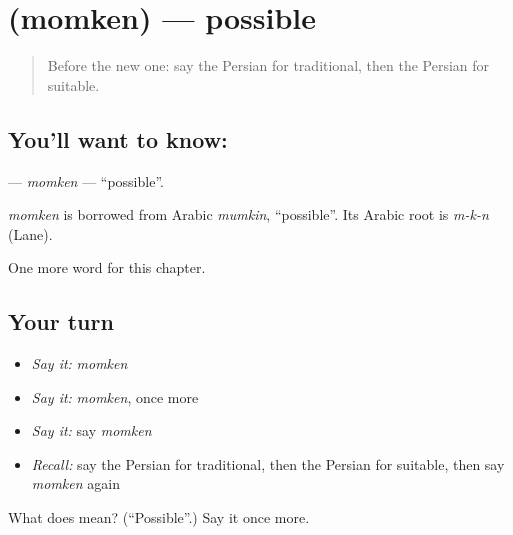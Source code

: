 \section[\texorpdfstring{\fa{ممکن} (momken)}{ممکن (momken)}]{ (momken) — possible}

\label{lesson:FA-C273-momken}



\begin{quote}
Before the new one: say the Persian for traditional, then the Persian for suitable.
\end{quote}

\subsection*{You'll want to know: }
\textbf{} — \emph{momken} — \textquotedblleft{}possible\textquotedblright{}.

\begin{cousinweb}
\emph{momken} is borrowed from Arabic \emph{mumkin}, \textquotedblleft{}possible\textquotedblright{}. Its Arabic root is \emph{m-k-n} (Lane).
\end{cousinweb}

\begin{grammarlens}[title={What you've built}]
One more word for this chapter.
\end{grammarlens}

\subsection*{Your turn}
\begin{itemize}
\raggedright
  \item \emph{Say it:} \emph{momken}
  \item \emph{Say it:} \emph{momken}, once more
  \item \emph{Say it:} say \emph{momken}
  \item \emph{Recall:} say the Persian for traditional, then the Persian for suitable, then say \emph{momken} again
\end{itemize}

\begin{tcolorbox}[breakable,colback=teal!4,colframe=teal!35!black,title={Before you move on}]
What does  mean? (\textquotedblleft{}Possible\textquotedblright{}.) Say it once more.
\end{tcolorbox}
